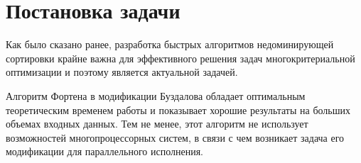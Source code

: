 \section{Постановка задачи}
Как было сказано ранее, разработка быстрых алгоритмов недоминирующей сортировки крайне важна для эффективного решения задач многокритериальной оптимизации и поэтому является актуальной задачей.

Алгоритм Фортена в модификации Буздалова обладает оптимальным теоретическим временем работы и показывает хорошие результаты на больших объемах входных данных.
Тем не менее, этот алгоритм не использует возможностей многопроцессорных систем, в связи с чем возникает задача его модификации для параллельного исполнения.
